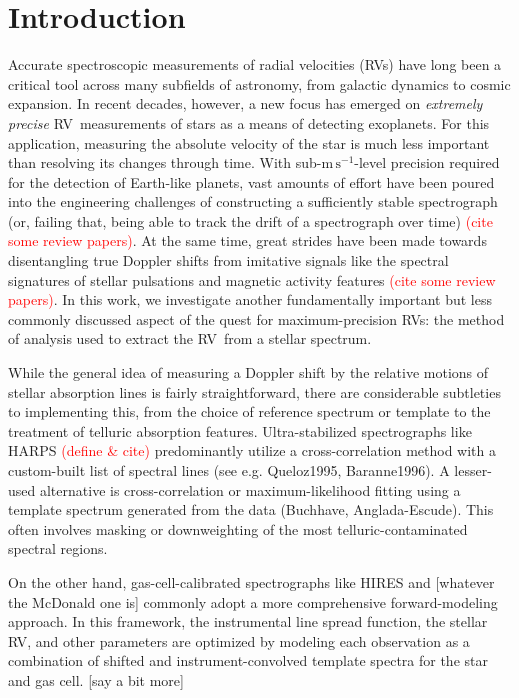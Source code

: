 \documentclass[modern]{aastex61}
\newcommand{\unit}[1]{\mathrm{#1}}
\newcommand{\m}{\unit{m}}
\newcommand{\s}{\unit{s}}
\newcommand{\ms}{\m\,\s^{-1}}
\newcommand{\todo}[1]{\textcolor{red}{#1}}  %
\newcommand{\acronym}[1]{{\small{#1}}}
\newcommand{\RV}{\acronym{RV}}
\begin{document}

\section{Introduction}

Accurate spectroscopic measurements of radial velocities (\RV s) have long been a critical tool across many subfields of astronomy, from galactic dynamics to cosmic expansion. In recent decades, however, a new focus has emerged on \textit{extremely precise} \RV\ measurements of stars as a means of detecting exoplanets. For this application, measuring the absolute velocity of the star is much less important than resolving its changes through time. With sub-$\ms$-level precision required for the detection of Earth-like planets, vast amounts of effort have been poured into the engineering challenges of constructing a sufficiently stable spectrograph (or, failing that, being able to track the drift of a spectrograph over time) \todo{(cite some review papers)}. At the same time, great strides have been made towards disentangling true Doppler shifts from imitative signals like the spectral signatures of stellar pulsations and magnetic activity features \todo{(cite some review papers)}.  In this work, we investigate another fundamentally important but less commonly discussed aspect of the quest for maximum-precision \RV s: the method of analysis used to extract the \RV\ from a stellar spectrum.

While the general idea of measuring a Doppler shift by the relative motions of stellar absorption lines is fairly straightforward, there are considerable subtleties to implementing this, from the choice of reference spectrum or template to the treatment of telluric absorption features. Ultra-stabilized spectrographs like HARPS \todo{(define \& cite)} predominantly utilize a cross-correlation method with a custom-built list of spectral lines (see e.g. Queloz1995, Baranne1996). A lesser-used alternative is cross-correlation or maximum-likelihood fitting using a template spectrum generated from the data (Buchhave, Anglada-Escude). This often involves masking or downweighting of the most telluric-contaminated spectral regions.

On the other hand, gas-cell-calibrated spectrographs like HIRES and [whatever the McDonald one is] commonly adopt a more comprehensive forward-modeling approach. In this framework, the instrumental line spread function, the stellar RV, and other parameters are optimized by modeling each observation as a combination of shifted and instrument-convolved template spectra for the star and gas cell. [say a bit more]
\end{document}
